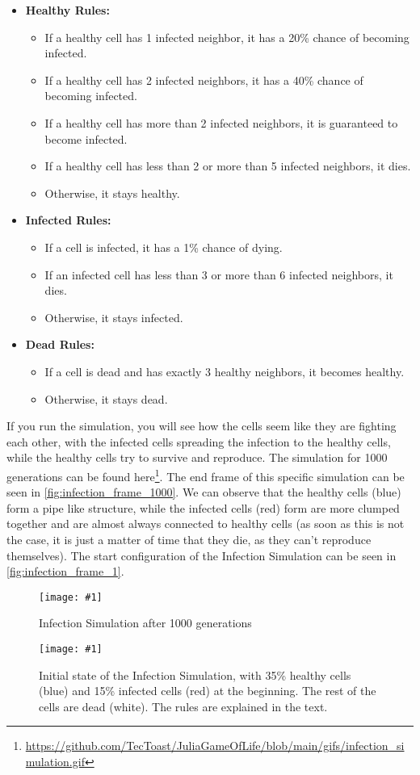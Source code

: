 \documentclass[a4paper,12pt]{llncs}
\numberwithin{equation}{section}
\newcommand{\imagewithwidth}[5]{
  \begin{figure}[htbp]%
    \begin{center}%
      \texttt{[image: \#1]}%
      \caption[#5]{#4}%
      \label{#3}%
    \end{center}%
  \end{figure}
}
\begin{document}
\begin{itemize}
  \item \textbf{Healthy Rules:}
        \begin{itemize}
          \item If a healthy cell has 1 infected neighbor, it has a 20\% chance of becoming infected.
          \item If a healthy cell has 2 infected neighbors, it has a 40\% chance of becoming infected.
          \item If a healthy cell has more than 2 infected neighbors, it is guaranteed to become infected.
          \item If a healthy cell has less than 2 or more than 5 infected neighbors, it dies.
          \item Otherwise, it stays healthy.
        \end{itemize}
  \item \textbf{Infected Rules:}
        \begin{itemize}
          \item If a cell is infected, it has a 1\% chance of dying.
          \item If an infected cell has less than 3 or more than 6 infected neighbors, it dies.
          \item Otherwise, it stays infected.
        \end{itemize}
  \item \textbf{Dead Rules:}
        \begin{itemize}
          \item If a cell is dead and has exactly 3 healthy neighbors, it becomes healthy.
          \item Otherwise, it stays dead.
        \end{itemize}
\end{itemize}
If you run the simulation, you will see how the cells seem like they are fighting each other, with the infected cells spreading the infection to the healthy cells, while the healthy cells try to survive and reproduce.
The simulation for 1000 generations can be found here\footnote{\url{https://github.com/TecToast/JuliaGameOfLife/blob/main/gifs/infection_simulation.gif}}. The end frame of this specific simulation can be seen in \autoref{fig:infection_frame_1000}.
We can observe that the healthy cells (blue) form a pipe like structure, while the infected cells (red) form are more clumped together and are almost always connected to healthy cells (as soon as this is not the case, it is just a matter of time that they die, as they can't reproduce themselves).
The start configuration of the Infection Simulation can be seen in \autoref{fig:infection_frame_1}.
\imagewithwidth{figures/infection_frame_1000}{0.8\textwidth}{fig:infection_frame_1000}{Infection Simulation after 1000 generations}{}
\imagewithwidth{figures/infection_frame_1}{0.8\textwidth}{fig:infection_frame_1}{Initial state of the Infection Simulation, with 35\% healthy cells (blue) and 15\% infected cells (red) at the beginning. The rest of the cells are dead (white). The rules are explained in the text.}{}
\end{document}
